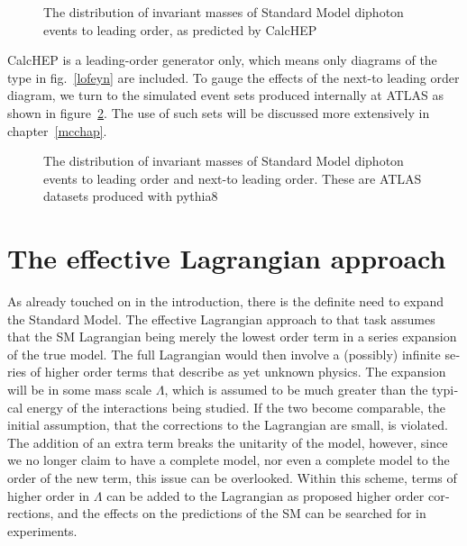 \begin{english}
\begin{figure}[hbt]
\begin{minipage}[b]{.69\textwidth}

\end{minipage}
\begin{minipage}[b]{.3\textwidth}
\caption{The distribution of invariant masses of Standard Model diphoton events to leading order, as predicted by CalcHEP \cite{calchep} \label{sminvm}}
\end{minipage}
\end{figure}

CalcHEP is a leading-order generator only, which means only diagrams of the type in fig.~\ref{lofeyn} are included. To gauge the effects of the next-to leading order diagram, we turn to the simulated event sets produced internally at ATLAS as shown in figure~\ref{sminvmnlo}. The use of such sets will be discussed more extensively in chapter~\ref{mcchap}.

\begin{figure}[hbt]
\begin{minipage}{.69\textwidth}
\begin{sffamily}

\end{sffamily}
\end{minipage}
\begin{minipage}[b]{.3\textwidth}
\caption{The distribution of invariant masses of Standard Model diphoton events to leading order and next-to leading order. These are ATLAS datasets produced with pythia8 \cite{pythia} \label{sminvmnlo}}
\end{minipage}
\end{figure}

\section{The effective Lagrangian approach}
As already touched on in the introduction, there is the definite need to expand the Standard Model. The effective Lagrangian approach to that task assumes that the SM Lagrangian being merely the lowest order term in a series expansion of the true model. The full Lagrangian would then involve a (possibly) infinite series of higher order terms that describe as yet unknown physics. The expansion will be in some mass scale $\Lambda$, which is assumed to be much greater than the typical energy of the interactions being studied. If the two become comparable, the initial assumption, that the corrections to the Lagrangian are small, is violated. The addition of an extra term breaks the unitarity of the model, however, since we no longer claim to have a complete model, nor even a complete model to the order of the new term, this issue can be overlooked. Within this scheme, terms of higher order in $\Lambda$ can be added to the Lagrangian as proposed higher order corrections, and the effects on the predictions of the SM can be searched for in experiments.


\end{english}
